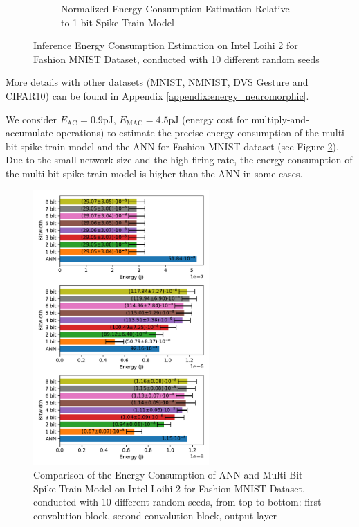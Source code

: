 \begin{figure}[!htpb]
\begin{subfigure}[H]{0.48\textwidth}
                \caption{Normalized Energy Consumption Estimation Relative to 1-bit Spike Train Model}
            \end{subfigure}
            \caption{Inference Energy Consumption Estimation on Intel Loihi 2 for Fashion MNIST Dataset, conducted with 10 different random seeds}
            \label{fig:inference_energy_nh}
        \end{figure}

        More details with other datasets (MNIST, NMNIST, DVS Gesture and CIFAR10) can be found in Appendix \ref{appendix:energy_neuromorphic}.

        We consider $E_{\text{AC}}=0.9\text{pJ}$, $E_{\text{MAC}}=4.5\text{pJ}$ (energy cost for multiply-and-accumulate operations) \cite{6757323} to estimate the precise energy consumption of the multi-bit spike train model and the ANN for Fashion MNIST dataset (see Figure \ref{fig:energy_ann_vs_snn}). Due to the small network size and the high firing rate, the energy consumption of the multi-bit spike train model is higher than the ANN in some cases.
        \begin{figure}[!htpb]
            \centering
            \includegraphics[width=0.6\textwidth]{../standard/FashionMNIST/plots/fashionmnist_energy_ann_vs_snn.pdf}
            \caption{Comparison of the Energy Consumption of ANN and Multi-Bit Spike Train Model on Intel Loihi 2 for Fashion MNIST Dataset, conducted with 10 different random seeds, from top to bottom: first convolution block, second convolution block, output layer}
            \label{fig:energy_ann_vs_snn}
        \end{figure}

